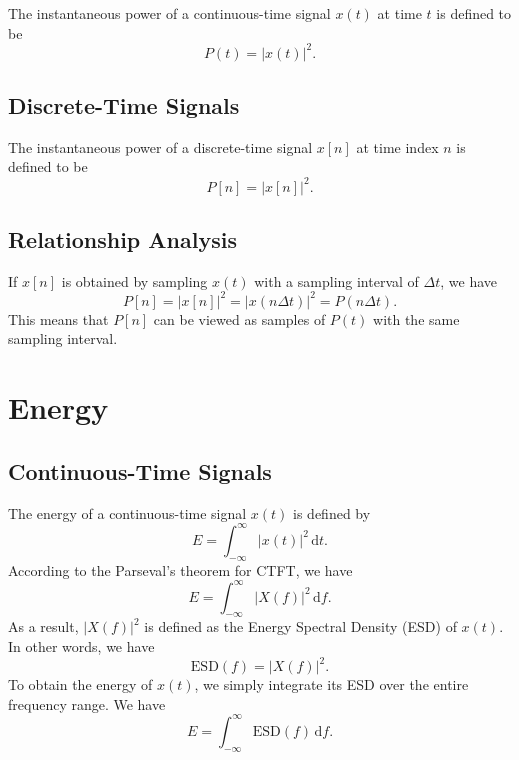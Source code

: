 \documentclass[journal,twoside]{IEEEtran}
\newcommand{\dd}{\,\mathrm{d}}
\begin{document}
The instantaneous power of a continuous-time signal $x(t)$ at time $t$ is defined to be
\begin{equation}
P(t) = |x(t)|^2.
\end{equation} 

\subsection{Discrete-Time Signals}

The instantaneous power of a discrete-time signal $x[n]$ at time index $n$ is defined to be
\begin{equation}
P[n] = |x[n]|^2.
\end{equation}

\subsection{Relationship Analysis}

If $x[n]$ is obtained by sampling $x(t)$ with a sampling interval of $\Delta t$, we have
\begin{equation}
P[n] = |x[n]|^2 = |x(n \Delta t)|^2 = P(n \Delta t).
\end{equation}
This means that $P[n]$ can be viewed as samples of $P(t)$ with the same sampling interval.





\section{Energy}

\subsection{Continuous-Time Signals}

The energy of a continuous-time signal $x(t)$ is defined by
\begin{equation}
E = \int_{-\infty}^{\infty}|x(t)|^2\dd t.
\end{equation}
According to the Parseval's theorem for CTFT, we have
\begin{equation}
E = \int_{-\infty}^{\infty}|X(f)|^2\dd f.
\end{equation}
As a result, $|X(f)|^2$ is defined as the Energy Spectral Density (ESD) of $x(t)$. In other words, we have
\begin{equation}
\mathrm{ESD}(f) = |X(f)|^2.
\end{equation}
To obtain the energy of $x(t)$, we simply integrate its ESD over the entire frequency range. We have
\begin{equation}
E = \int_{-\infty}^{\infty}\mathrm{ESD}(f)\dd f.
\end{equation}
\end{document}
